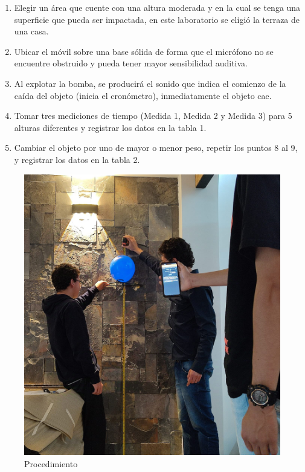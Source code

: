 \begin{multicols}{2}
\begin{enumerate}
    \item Elegir un área que cuente con una altura moderada y en la cual se tenga una superficie que pueda ser impactada, en este laboratorio se eligió la terraza de una casa. 
    
    \item Ubicar el móvil sobre una base sólida de forma que el micrófono no se encuentre obstruido y pueda tener mayor sensibilidad auditiva.
    
    \item Al explotar la bomba, se producirá el sonido que indica el comienzo de la caída del objeto (inicia el cronómetro), inmediatamente el objeto cae.
    
    \item Tomar tres mediciones de tiempo (Medida 1, Medida 2 y Medida 3) para 5 alturas diferentes y registrar los datos en la tabla 1.
    
    \item Cambiar el objeto por uno de mayor o menor peso, repetir los puntos 8 al 9, y registrar los datos en la tabla 2.
\end{enumerate}

\begin{figure}[H]
    \centering
    \includegraphics[scale=0.1]{fig/procedimiento.png}
    \caption{Procedimiento}
    \label{fig:procedimiento}
\end{figure}


\end{multicols}
